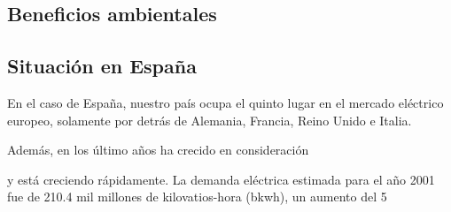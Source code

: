 \vspace{1mm}

\subsection{Beneficios ambientales}






\vspace{1mm}

\subsection{Situación en España}

En el caso de España, nuestro país ocupa el quinto lugar en el mercado eléctrico europeo, solamente por detrás de Alemania, Francia, Reino Unido e Italia. 


Además, en los último años ha crecido en consideración 

y está creciendo rápidamente. La demanda eléctrica estimada para el año 2001 fue de 210.4 mil millones de kilovatios-hora (bkwh), un aumento del 5%


